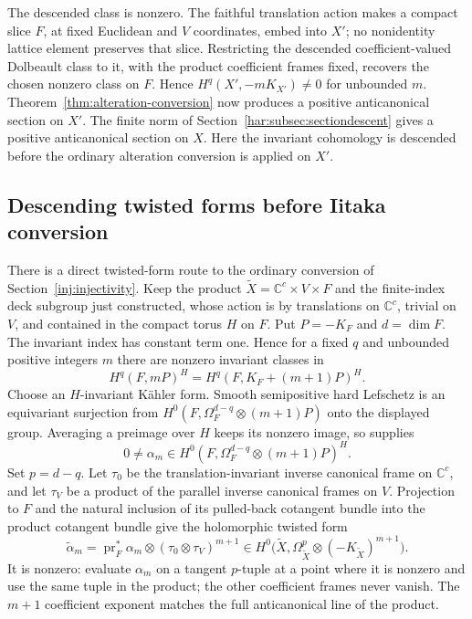 The descended class is nonzero. The faithful translation action makes
a compact slice \(F\), at fixed Euclidean and \(V\) coordinates,
embed into \(X'\); no nonidentity lattice element preserves that
slice. Restricting the descended coefficient-valued Dolbeault class
to it, with the product coefficient frames fixed, recovers the chosen
nonzero class on \(F\). Hence \(H^q(X',-mK_{X'})\ne0\) for unbounded
\(m\). Theorem~\ref{thm:alteration-conversion} now produces a positive
anticanonical section on \(X'\). The finite norm of
Section~\ref{har:subsec:sectiondescent} gives a positive anticanonical
section on $X$. Here the invariant cohomology is descended before the
ordinary alteration conversion is applied on $X'$.

\subsection{Descending twisted forms before Iitaka conversion}
\label{har:subsec:formdescent}

There is a direct twisted-form route to the ordinary conversion of
Section~\ref{inj:injectivity}.  Keep the product
$\widetilde X=\mathbb C^c\times V\times F$ and the finite-index
deck subgroup just constructed, whose action is by translations on
$\mathbb C^c$, trivial on $V$, and contained in the compact torus
$H$ on $F$.  Put $P=-K_F$ and $d=\dim F$.  The invariant index has
constant term one.  Hence for a fixed $q$ and unbounded positive
integers $m$ there are nonzero invariant classes in
\[
 H^q(F,mP)^H=H^q(F,K_F+(m+1)P)^H.
\]
Choose an $H$-invariant K\"ahler form.  Smooth semipositive hard
Lefschetz \cite{DPS2001} is an equivariant surjection from
$H^0(F,\Omega_F^{d-q}\otimes (m+1)P)$ onto the displayed group.
Averaging a preimage over $H$ keeps its nonzero image, so supplies
\[
 0\ne\alpha_m\in
 H^0(F,\Omega_F^{d-q}\otimes (m+1)P)^H.
\]
Set $p=d-q$.  Let $\tau_0$ be the translation-invariant inverse
canonical frame on $\mathbb C^c$, and let $\tau_V$ be a product of
the parallel inverse canonical frames on $V$.  Projection to $F$
and the natural inclusion of its pulled-back cotangent bundle into
the product cotangent bundle give the holomorphic twisted form
\[
 \widetilde\alpha_m=
 \operatorname{pr}_F^*\alpha_m\otimes
 (\tau_0\otimes\tau_V)^{m+1}
 \in H^0\bigl(\widetilde X,
       \Omega_{\widetilde X}^{p}\otimes(-K_{\widetilde X})^{m+1}\bigr).
\]
It is nonzero: evaluate $\alpha_m$ on a tangent $p$-tuple at a point
where it is nonzero and use the same tuple in the product; the other
coefficient frames never vanish.  The $m+1$ coefficient exponent
matches the full anticanonical line of the product.

